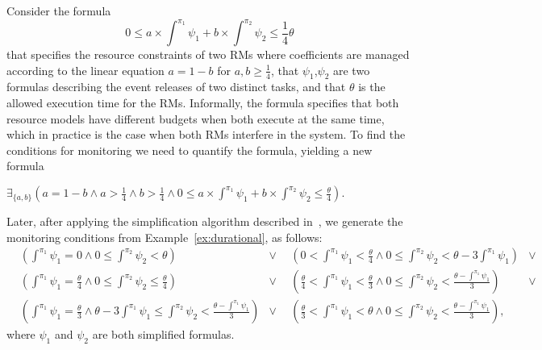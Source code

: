 Consider the formula {\small
$$
0 \leq a\times \int^{\pi_1} \psi_1 + b\times \int^{\pi_2} \psi_2 \leq \frac{1}{4}\theta
$$}%
that specifies the resource constraints of two \acp{RM} where coefficients are managed according to the linear equation $a=1-b$ for $a,b \geq \frac{1}{4}$, that $\psi_1$,$\psi_2$ are two formulas describing the event releases of two distinct tasks, and that $\theta$ is the allowed execution time for the \acp{RM}. %
Informally, the formula specifies that both resource models have different budgets when both execute at the same time, which in practice is the case when both \ac{RM}s interfere	 in the system.
To find the conditions for monitoring we need to quantify the formula, yielding a new formula%
\begin{small}
$
\exists _{\{a,b\}}\left(a=1-b\land a>\frac{1}{4}\land b>\frac{1}{4}\land 0 \leq a\times \int^{\pi_1} \psi_1 + b\times \int^{\pi_2} \psi_2 \leq \frac{\theta}{4}\right).
$
\end{small}%
Later, after applying the simplification algorithm described in~\cite{MatosPedro2015}, we generate the monitoring conditions from Example~\ref{ex:durational}, as follows:
{
\begin{align*}
&\scriptstyle( \int^{\pi_1} \psi_1=0\land 0\leq \int^{\pi_2} \psi_2<\theta )&\lor \ \ %
&\scriptstyle\left(0<\int^{\pi_1} \psi_1<\frac{\theta }{4}\land 0\leq \int^{\pi_2} \psi_2<\theta -3 \int^{\pi_1} \psi_1\right)&\lor \\
&\scriptstyle\left(\int^{\pi_1} \psi_1=\frac{\theta }{4}\land 0\leq \int^{\pi_2} \psi_2\leq \frac{\theta }{4}\right)&\lor \ \ %
&\scriptstyle\left(\frac{\theta }{4}<\int^{\pi_1} \psi_1<\frac{\theta }{3}\land 0\leq \int^{\pi_2} \psi_2<\frac{\theta -\int^{\pi_1} \psi_1}{3}\right)&\lor \\
&\scriptstyle\left(\int^{\pi_1} \psi_1=\frac{\theta }{3}\land \theta -3 \int^{\pi_1} \psi_1\leq \int^{\pi_2} \psi_2<\frac{\theta -\int^{\pi_1} \psi_1}{3}\right)&\lor \ \ %
&\scriptstyle\left(\frac{\theta }{3}<\int^{\pi_1} \psi_1<\theta \land 0\leq \int^{\pi_2} \psi_2<\frac{\theta -\int^{\pi_1} \psi_1}{3}\right),
\end{align*}
}%
where $\psi_1$ and $\psi_2$ are both simplified formulas.

